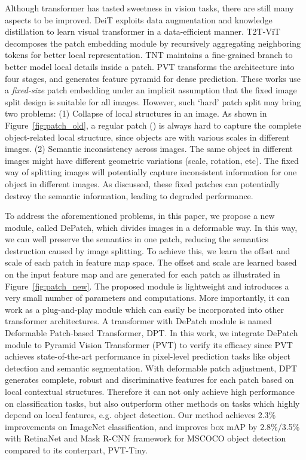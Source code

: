 \documentclass[sigconf,screen]{acmart}
\begin{document}
Although transformer has tasted sweetness in vision tasks, there are still many aspects to be improved. DeiT \cite{deit} exploits data augmentation and knowledge distillation to learn visual transformer in a data-efficient manner. T2T-ViT \cite{t2tvit} decomposes the patch embedding module by recursively aggregating neighboring tokens for better local representation. TNT \cite{tnt} maintains a fine-grained branch to better model local details inside a patch. PVT \cite{pvt} transforms the architecture into four stages, and generates feature pyramid for dense prediction. 
These works use a \emph{fixed-size} patch embedding under an implicit assumption that the fixed image split design is suitable for all images. 
However, such `hard' patch split may bring two problems: (1) Collapse of local structures in an image. As shown in Figure~\ref{fig:patch_old}, a regular patch () is always hard to capture the complete object-related local structure, since objects are with various scales in different images. (2) Semantic inconsistency across images. The same object in different images might have different geometric variations (scale, rotation, etc). The fixed way of splitting images will potentially capture inconsistent information for one object in different images. 
As discussed, these fixed patches can potentially destroy the semantic information, leading to degraded performance.

To address the aforementioned problems, in this paper, we propose a new module, called DePatch, which divides images in a deformable way. In this way, we can well preserve the semantics in one patch, reducing the semantics destruction caused by image splitting. To achieve this, we learn the offset and scale of each patch in feature map space. The offset and scale are learned based on the input feature map and are generated for each patch as illustrated in Figure~\ref{fig:patch_new}.
The proposed module is lightweight and introduces a very small number of parameters and computations.
More importantly, it can work as a plug-and-play module which can easily be incorporated into other transformer architectures. A transformer with DePatch module is named  Deformable Patch-based Transformer, DPT. In this work, we integrate DePatch module to Pyramid Vision Transformer (PVT) \cite{pvt} to verify its efficacy since PVT achieves state-of-the-art performance in pixel-level prediction tasks like object detection and semantic segmentation.  
With deformable patch adjustment, DPT generates complete, robust and discriminative features for each patch based on local contextual structures. Therefore it can not only achieve high performance on classification tasks, but also outperform other methods on tasks which highly depend on local features, e.g. object detection. 
Our method achieves 2.3\% improvements on ImageNet classification, and improves box mAP by 2.8\%/3.5\% with RetinaNet and Mask R-CNN framework for MSCOCO object detection compared to its conterpart, PVT-Tiny.
\end{document}
